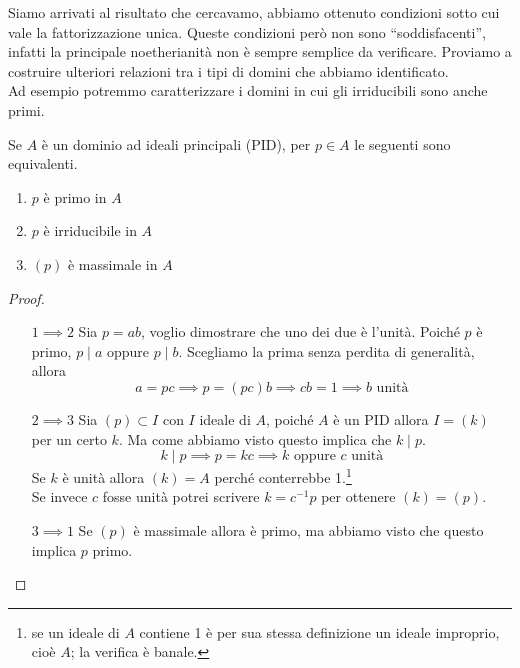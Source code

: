 \begin{osservazione}
	Siamo arrivati al risultato che cercavamo, abbiamo ottenuto condizioni sotto cui vale la fattorizzazione unica. Queste condizioni però non sono \enquote{soddisfacenti}, infatti la principale noetherianità non è sempre semplice da verificare. Proviamo a costruire ulteriori relazioni tra i tipi di domini che abbiamo identificato. \\ Ad esempio potremmo caratterizzare i domini in cui gli irriducibili sono anche primi.
\end{osservazione}
\begin{teorema}
	Se $A$ è un dominio ad ideali principali (PID), per $p\in A$ le seguenti sono equivalenti.
	\begin{enumerate}
		\item $p$ è primo in $A$
		\item $p$ è irriducibile in $A$
		\item $(p)$ è massimale in $A$
	\end{enumerate}
\end{teorema}
\begin{proof}\
	\begin{itemize}
		\item[$1 \implies 2$] Sia $p=ab$, voglio dimostrare che uno dei due è l'unità. Poiché $p$ è primo, $p\mid a$ oppure $p\mid b$. Scegliamo la prima senza perdita di generalità, allora 
		\begin{equation*}
		a=pc \implies p=(pc)b\implies cb=1 \implies b \text{ unità}
		\end{equation*}
		\item[$2 \implies 3$] Sia $(p)\subset I$ con $I$ ideale di $A$, poiché $A$ è un PID allora $I=(k)$ per un certo $k$. Ma come abbiamo visto questo implica che $k\mid p$.
		\begin{equation*}
		k\mid p \implies p=kc \implies k \text{ oppure } c \text{ unità}
		\end{equation*}
		Se $k$ è unità allora $(k)=A$ perché conterrebbe 1.\footnote{se un ideale di $A$ contiene 1 è per sua stessa definizione un ideale improprio, cioè $A$; la verifica è banale.} \\ Se invece $c$ fosse unità potrei scrivere $k=c^{-1}p$ per ottenere $(k)=(p)$.
		\item[$3 \implies 1$] Se $(p)$ è massimale allora è primo, ma abbiamo visto che questo implica $p$ primo.
	\end{itemize}
\end{proof}
